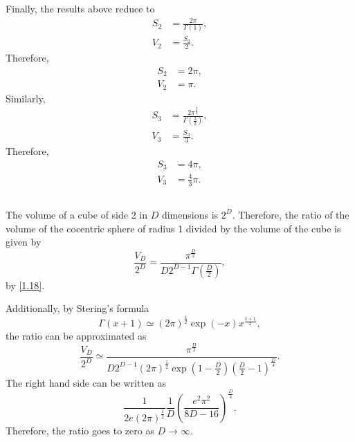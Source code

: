 Finally, the results above reduce to
%
\begin{equation}
\begin{aligned}
S_2 &= \frac{2 \pi}{\Gamma(1)}, \\
V_2 &= \frac{S_2}{2}. 
\end{aligned}
\end{equation}
%
Therefore, 
%
\begin{equation}
\begin{aligned}
S_2 &= 2 \pi, \\
V_2 &= \pi. 
\end{aligned}
\end{equation}
%
Similarly,
%
\begin{equation}
\begin{aligned}
S_3 &= \frac{2 \pi ^ \frac{3}{2}}{\Gamma \left( \frac{3}{2} \right)}, \\
V_3 &= \frac{S_3}{3}. 
\end{aligned}
\end{equation}
%
Therefore, 
%
\begin{equation}
\begin{aligned}
S_3 &= 4 \pi, \\
V_3 &= \frac{4}{3} \pi. 
\end{aligned}
\end{equation}
%


\subsection{}
\label{1.19}
The volume of a cube of side 2 in $D$ dimensions is $2 ^ D$. 
Therefore, the ratio of the volume of the cocentric sphere of radius 1 divided by the volume of the cube is given by
%
\begin{equation}
\frac{V_D}{2 ^ D} = \frac{\pi ^ \frac{D}{2}}{D 2 ^ {D - 1} \Gamma \left( \frac{D}{2} \right)},
\end{equation}
%
by \ref{1.18}.

Additionally, by Stering's formula
%
\begin{equation}
\Gamma(x + 1) \simeq (2 \pi) ^ \frac{1}{2} \exp(- x) x ^ {\frac{x + 1}{2}},
\end{equation}
%
the ratio can be approximated as
%
\begin{equation}
\frac{V_D}{2 ^ D} \simeq \frac{\pi ^ \frac{D}{2}}{D 2 ^ {D - 1} (2 \pi) ^ \frac{1}{2} \exp \left( 1 - \frac{D}{2} \right) \left( \frac{D}{2} - 1 \right) ^ \frac{D}{4}}.
\end{equation}
%
The right hand side can be written as 
%
\begin{equation}
\frac{1}{2 e (2 \pi) ^ \frac{1}{2}} \frac{1}{D} \left( \frac{e ^ 2 \pi ^ 2}{ 8 D - 16} \right) ^ \frac{D}{4}.
\end{equation}
%
Therefore, the ratio goes to zero as $D \to \infty$.

